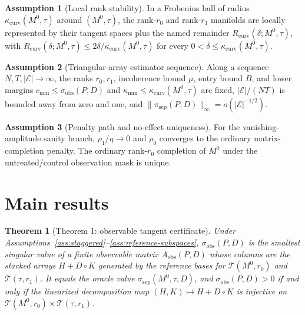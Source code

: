 \documentclass[11pt]{article}
\theoremstyle{definition}
\newtheorem{assumption}{Assumption}
\theoremstyle{plain}
\newtheorem{theorem}{Theorem}
\theoremstyle{remark}
\begin{document}
\begin{assumption}[Local rank stability]\label{ass:rank-stability}
In a Frobenius ball of radius \(\kappa_{\mathrm{curv}}(M^0,\tau)\) around \((M^0,\tau)\), the rank-\(r_0\) and rank-\(r_1\) manifolds are locally represented by their tangent spaces plus the named remainder \(R_{\mathrm{curv}}(\delta;M^0,\tau)\), with \(R_{\mathrm{curv}}(\delta;M^0,\tau)\le 2\delta/\kappa_{\mathrm{curv}}(M^0,\tau)\) for every \(0<\delta\le\kappa_{\mathrm{curv}}(M^0,\tau)\).
\end{assumption}

\begin{assumption}[Triangular-array estimator sequence]\label{ass:asymptotic}
Along a sequence \(N,T,|\mathcal E|\to\infty\), the ranks \(r_0,r_1\), incoherence bound \(\mu\), entry bound \(B\), and lower margins \(c_{\min}\le\sigma_{\mathrm{obs}}(P,D)\) and \(\kappa_{\min}\le\kappa_{\mathrm{curv}}(M^0,\tau)\) are fixed, \(|\mathcal E|/(NT)\) is bounded away from zero and one, and \(\|\pi_{\mathrm{sep}}(P,D)\|_{\infty}=o(|\mathcal E|^{-1/2})\).
\end{assumption}

\begin{assumption}[Penalty path and no-effect uniqueness]\label{ass:penalty-path}
For the vanishing-amplitude sanity branch, \(\rho_1/\eta\to0\) and \(\rho_0\) converges to the ordinary matrix-completion penalty.  The ordinary rank-\(r_0\) completion of \(M^0\) under the untreated/control observation mask is unique.
\end{assumption}

\section{Main results}
\begin{theorem}[Theorem 1: observable tangent certificate]\label{thm:certificate}
Under Assumptions~\ref{ass:staggered}--\ref{ass:reference-subspaces}, \(\sigma_{\mathrm{obs}}(P,D)\) is the smallest singular value of a finite observable matrix \(A_{\mathrm{obs}}(P,D)\) whose columns are the stacked arrays \(H+D\circ K\) generated by the reference bases for \(\mathcal T(M^0,r_0)\) and \(\mathcal T(\tau,r_1)\).  It equals the oracle value \(\sigma_{\mathrm{sep}}(M^0,\tau,D)\), and \(\sigma_{\mathrm{obs}}(P,D)>0\) if and only if the linearized decomposition map \((H,K)\mapsto H+D\circ K\) is injective on \(\mathcal T(M^0,r_0)\times\mathcal T(\tau,r_1)\).
\end{theorem}
\end{document}
